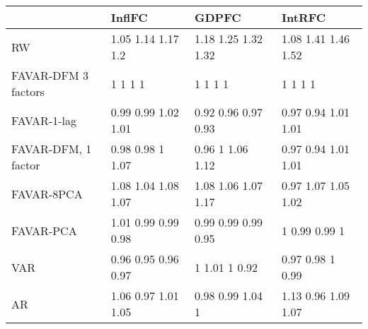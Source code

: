 \begin{tabular}{llll}
\toprule 
& InflFC & GDPFC & IntRFC \\ 
\midrule 
RW & 1.05        1.14        1.17         1.2 & 1.18        1.25        1.32        1.32 & 1.08        1.41        1.46        1.52 \\ 
FAVAR-DFM 3 factors & 1  1  1  1 & 1  1  1  1 & 1  1  1  1 \\ 
FAVAR-1-lag & 0.99        0.99        1.02        1.01 & 0.92        0.96        0.97        0.93 & 0.97        0.94        1.01        1.01 \\ 
FAVAR-DFM, 1 factor & 0.98        0.98           1        1.07 & 0.96           1        1.06        1.12 & 0.97        0.94        1.01        1.01 \\ 
FAVAR-8PCA & 1.08        1.04        1.08        1.07 & 1.08        1.06        1.07        1.17 & 0.97        1.07        1.05        1.02 \\ 
FAVAR-PCA & 1.01        0.99        0.99        0.98 & 0.99        0.99        0.99        0.95 & 1        0.99        0.99           1 \\ 
VAR & 0.96        0.95        0.96        0.97 & 1        1.01           1        0.92 & 0.97        0.98           1        0.99 \\ 
AR & 1.06        0.97        1.01        1.05 & 0.98        0.99        1.04           1 & 1.13        0.96        1.09        1.07 \\ 
\bottomrule 
\end{tabular}